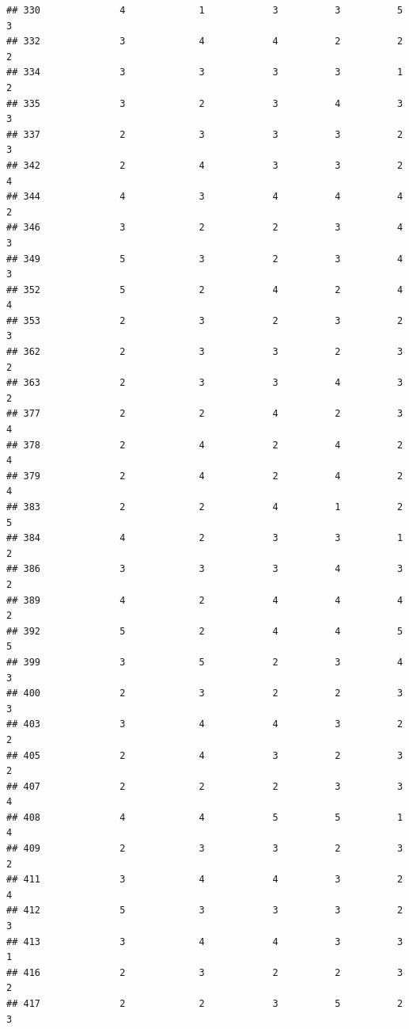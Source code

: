 \documentclass[
]{article}
\begin{document}
\begin{verbatim}
## 330              4             1            3          3          5        3
## 332              3             4            4          2          2        2
## 334              3             3            3          3          1        2
## 335              3             2            3          4          3        3
## 337              2             3            3          3          2        3
## 342              2             4            3          3          2        4
## 344              4             3            4          4          4        2
## 346              3             2            2          3          4        3
## 349              5             3            2          3          4        3
## 352              5             2            4          2          4        4
## 353              2             3            2          3          2        3
## 362              2             3            3          2          3        2
## 363              2             3            3          4          3        2
## 377              2             2            4          2          3        4
## 378              2             4            2          4          2        4
## 379              2             4            2          4          2        4
## 383              2             2            4          1          2        5
## 384              4             2            3          3          1        2
## 386              3             3            3          4          3        2
## 389              4             2            4          4          4        2
## 392              5             2            4          4          5        5
## 399              3             5            2          3          4        3
## 400              2             3            2          2          3        3
## 403              3             4            4          3          2        2
## 405              2             4            3          2          3        2
## 407              2             2            2          3          3        4
## 408              4             4            5          5          1        4
## 409              2             3            3          2          3        2
## 411              3             4            4          3          2        4
## 412              5             3            3          3          2        3
## 413              3             4            4          3          3        1
## 416              2             3            2          2          3        2
## 417              2             2            3          5          2        3

\end{verbatim}
\end{document}

